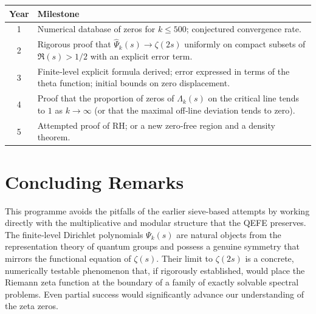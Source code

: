 \documentclass[11pt,a4paper]{article}
\theoremstyle{remark}
\begin{document}
\begin{center}
\begin{tabular}{c p{10cm}}
\toprule
\textbf{Year} & \textbf{Milestone} \\
\midrule
1 & Numerical database of zeros for \(k\le 500\); conjectured convergence rate. \\
2 & Rigorous proof that \(\widehat{\Psi}_k(s)\to\zeta(2s)\) uniformly on compact subsets of \(\Re(s)>1/2\) with an explicit error term. \\
3 & Finite‑level explicit formula derived; error expressed in terms of the theta function; initial bounds on zero displacement. \\
4 & Proof that the proportion of zeros of \(\Lambda_k(s)\) on the critical line tends to \(1\) as \(k\to\infty\) (or that the maximal off‑line deviation tends to zero). \\
5 & Attempted proof of RH; or a new zero‑free region and a density theorem. \\
\bottomrule
\end{tabular}
\end{center}

\section{Concluding Remarks}

This programme avoids the pitfalls of the earlier sieve‑based attempts by working directly with the multiplicative and modular structure that the QEFE preserves.
The finite‑level Dirichlet polynomials \(\Psi_k(s)\) are natural objects from the representation theory of quantum groups and possess a genuine symmetry that mirrors the functional equation of \(\zeta(s)\).
Their limit to \(\zeta(2s)\) is a concrete, numerically testable phenomenon that, if rigorously established, would place the Riemann zeta function at the boundary of a family of exactly solvable spectral problems.
Even partial success would significantly advance our understanding of the zeta zeros.
\end{document}
